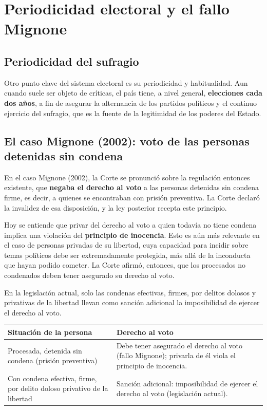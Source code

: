 \documentclass[12pt,oneside]{book}
\begin{document}
\section{Periodicidad electoral y el fallo Mignone}

\subsection{Periodicidad del sufragio}

Otro punto clave del sistema electoral es su periodicidad y habitualidad. Aun cuando suele ser objeto de críticas, el país tiene, a nivel general, \textbf{elecciones cada dos años}, a fin de asegurar la alternancia de los partidos políticos y el continuo ejercicio del sufragio, que es la fuente de la legitimidad de los poderes del Estado.

\subsection{El caso Mignone (2002): voto de las personas detenidas sin condena}

En el caso Mignone (2002), la Corte se pronunció sobre la regulación entonces existente, que \textbf{negaba el derecho al voto} a las personas detenidas sin condena firme, es decir, a quienes se encontraban con prisión preventiva. La Corte declaró la invalidez de esa disposición, y la ley posterior recepta este principio.

Hoy se entiende que privar del derecho al voto a quien todavía no tiene condena implica una violación del \textbf{principio de inocencia}. Esto es aún más relevante en el caso de personas privadas de su libertad, cuya capacidad para incidir sobre temas políticos debe ser extremadamente protegida, más allá de la inconducta que hayan podido cometer. La Corte afirmó, entonces, que los procesados no condenados deben tener asegurado su derecho al voto.

En la legislación actual, solo las condenas efectivas, firmes, por delitos dolosos y privativas de la libertad llevan como sanción adicional la imposibilidad de ejercer el derecho al voto.

\begin{table}[H]
\centering
\begin{tabularx}{\textwidth}{>{\raggedright\arraybackslash}p{} >{\raggedright\arraybackslash}X}
\toprule
\textbf{Situación de la persona} & \textbf{Derecho al voto} \\
\midrule
Procesada, detenida sin condena (prisión preventiva) & Debe tener asegurado el derecho al voto (fallo Mignone); privarla de él viola el principio de inocencia. \\
Con condena efectiva, firme, por delito doloso privativo de la libertad & Sanción adicional: imposibilidad de ejercer el derecho al voto (legislación actual). \\
\bottomrule
\end{tabularx}
\end{table}
\end{document}
